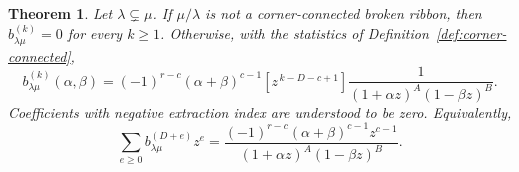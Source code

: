 \documentclass[11pt]{amsart}
\numberwithin{equation}{section}
\newtheorem{theorem}{Theorem}[section]
\theoremstyle{definition}
\theoremstyle{remark}
\begin{document}
\begin{theorem}\label{thm:compact-boundary}
Let $\lambda\subsetneq\mu$. If $\mu/\lambda$ is not a corner-connected broken ribbon, then $b^{(k)}_{\lambda\mu}=0$ for
every $k\geq1$. Otherwise, with the statistics of
Definition~\ref{def:corner-connected},
\begin{equation}\label{eq:compact-boundary}
 b^{(k)}_{\lambda\mu}(\alpha,\beta)
 =(-1)^{r-c}(\alpha+\beta)^{c-1}
 [z^{\,k-D-c+1}]
 \frac{1}{(1+\alpha z)^A(1-\beta z)^B}.
\end{equation}
Coefficients with negative extraction index are understood to be zero.
Equivalently,
\begin{equation}\label{eq:compact-generating}
 \sum_{e\geq0}b^{(D+e)}_{\lambda\mu}z^e
 =\frac{(-1)^{r-c}(\alpha+\beta)^{c-1}z^{c-1}}
 {(1+\alpha z)^A(1-\beta z)^B}.
\end{equation}
\end{theorem}
\end{document}
